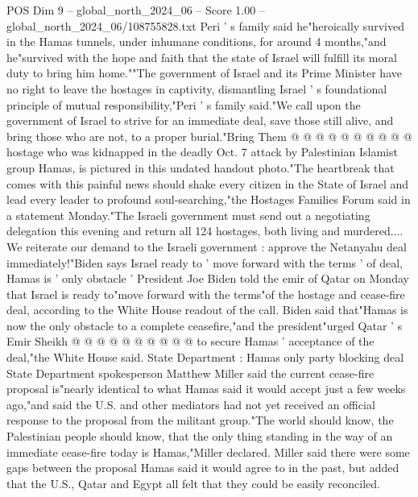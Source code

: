 \begin{textsample}{POS Dim 9 – global\_north\_2024\_06 – Score 1.00 – global\_north\_2024\_06/108755828.txt}
Peri ' s family said he"heroically survived in the Hamas tunnels, under inhumane conditions, for around 4 months,"and he"survived with the hope and faith that the state of Israel will fulfill its moral duty to bring him home.""The government of Israel and its Prime Minister have no right to leave the hostages in captivity, dismantling Israel ' s foundational principle of mutual responsibility,"Peri ' s family said."We call upon the government of Israel to strive for an immediate deal, save those still alive, and bring those who are not, to a proper burial."Bring Them @ @ @ @ @ @ @ @ @ @ hostage who was kidnapped in the deadly Oct. 7 attack by Palestinian Islamist group Hamas, is pictured in this undated handout photo."The heartbreak that comes with this painful news should shake every citizen in the State of Israel and lead every leader to profound soul-searching,"the Hostages Families Forum said in a statement Monday."The Israeli government must send out a negotiating delegation this evening and return all 124 hostages, both living and murdered....
We reiterate our demand to the Israeli government : approve the Netanyahu deal immediately!"Biden says Israel ready to ' move forward with the terms ' of deal, Hamas is ' only obstacle ' President Joe Biden told the emir of Qatar on Monday that Israel is ready to"move forward with the terms"of the hostage and cease-fire deal, according to the White House readout of the call.
Biden said that"Hamas is now the only obstacle to a complete ceasefire,"and the president"urged Qatar ' s Emir Sheikh @ @ @ @ @ @ @ @ @ @ to secure Hamas ' acceptance of the deal,"the White House said.
State Department : Hamas only party blocking deal State Department spokesperson Matthew Miller said the current cease-fire proposal is"nearly identical to what Hamas said it would accept just a few weeks ago,"and said the U.S. and other mediators had not yet received an official response to the proposal from the militant group."The world should know, the Palestinian people should know, that the only thing standing in the way of an immediate cease-fire today is Hamas,"Miller declared.
Miller said there were some gaps between the proposal Hamas said it would agree to in the past, but added that the U.S., Qatar and Egypt all felt that they could be easily reconciled.

\end{textsample}
